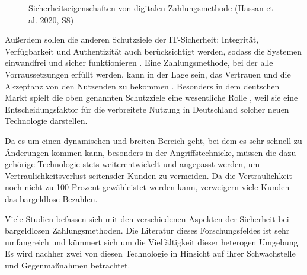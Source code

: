 \vfill
\begin{figure}[htb]
    \caption{Sicherheitseigenschaften von digitalen Zahlungsmethode (Hassan et al. 2020, S8)}
    \label{fig:refark_HARE}
\end{figure}
\vfill

Außerdem sollen die anderen Schutzziele der IT-Sicherheit: Integrität, Verfügbarkeit und Authentizität
auch berücksichtigt werden, sodass die Systemen einwandfrei und sicher funktionieren \cite{refip:GMPS}. 
Eine Zahlungsmethode, bei der alle Vorraussetzungen erfüllt werden, kann in der Lage sein, das Vertrauen 
und die Akzeptanz von den Nutzenden zu bekommen \cite{refart:HARE}. Besonders in dem deutschen Markt spielt
die oben genannten Schutzziele eine wesentliche Rolle \cite{refip:DKAM}, weil sie eine Entscheidungsfaktor 
für die verbreitete Nutzung in Deutschland solcher neuen Technologie darstellen. 




Da es um einen dynamischen und breiten Bereich geht, bei dem es sehr schnell zu Änderungen kommen kann, 
besonders in der Angriffstechnicke, müssen die dazu gehörige \cite{refip:NYRS} Technologie stets 
weiterentwickelt und angepasst werden, um Vertraulichkeitsverlust seitensder Kunden zu vermeiden. 
Da die Vertraulichkeit noch nicht zu 100 Prozent gewähleistet werden kann, verweigern viele Kunden
das bargeldlose Bezahlen.

Viele Studien befassen sich mit den verschiedenen Aspekten der Sicherheit bei bargeldlosen Zahlungsmethoden.
Die Literatur dieses Forschungsfeldes ist sehr umfangreich und kümmert sich um die Vielfältigkeit 
dieser heterogen \cite{refip:GMPS} Umgebung. Es wird nachher zwei von diesen Technologie in Hinsicht auf ihrer
Schwachstelle und Gegenmaßnahmen betrachtet.





